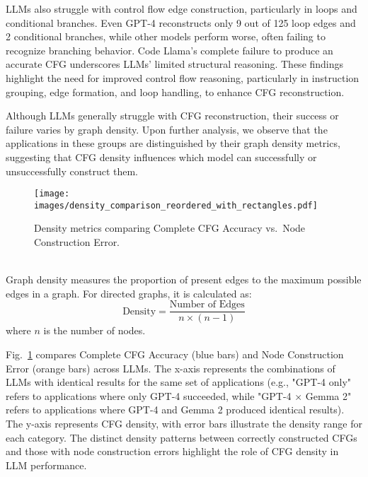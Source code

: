 LLMs also struggle with control flow edge construction, particularly in loops and conditional branches. Even GPT-4 reconstructs only 9 out of 125 loop edges and 2 conditional branches, while other models perform worse, often failing to recognize branching behavior. Code Llama’s complete failure to produce an accurate CFG underscores LLMs’ limited structural reasoning. These findings highlight the need for improved control flow reasoning, particularly in instruction grouping, edge formation, and loop handling, to enhance CFG reconstruction.

Although LLMs generally struggle with CFG reconstruction, their success or failure varies by graph density.
Upon further analysis, we observe that the applications in these groups are distinguished by their graph density metrics, suggesting that CFG density influences which model can successfully or unsuccessfully construct them.
\begin{figure}[!t]
\centering
\texttt{[image: images/density\_comparison\_reordered\_with\_rectangles.pdf]}
\vspace{-1em}
\caption{Density metrics comparing Complete CFG Accuracy vs.\ Node Construction Error.}%
\label{fig:veen_CFG}
\vspace{-1em}
\end{figure}\\
 Graph density measures the proportion of present edges to the maximum possible edges in a graph. For directed graphs, it is calculated as:
\begin{equation}
    \text{Density} = \frac{\text{Number of Edges}}{n \times (n - 1)}
\end{equation}
where \( n \) is the number of nodes.

Fig.~\ref{fig:veen_CFG} compares Complete CFG Accuracy (blue bars) and Node Construction Error (orange bars) across LLMs. The x-axis represents the combinations of LLMs with identical results for the same set of applications (e.g., "GPT-4 only" refers to applications where only GPT-4 succeeded, while "GPT-4 × Gemma 2" refers to applications where GPT-4 and Gemma 2 produced identical results). The y-axis represents CFG density, with error bars illustrate the density range for each category. The distinct density patterns between correctly constructed CFGs and those with node construction errors highlight the role of CFG density in LLM performance. 


